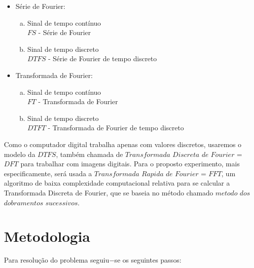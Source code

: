 \documentclass[conference]{IEEEtran}
\begin{document}
\begin{itemize}
	\item S\'erie de Fourier:
	\begin{enumerate}[(a)]
		\item Sinal de tempo cont\'inuo
		\\
		$FS$ - S\'erie de Fourier
		\item Sinal de tempo discreto
		\\
		$DTFS$ - S\'erie de Fourier de tempo discreto
	\end{enumerate}
	\item Transformada de Fourier:
	\begin{enumerate}[(a)]
		\item Sinal de tempo cont\'inuo
		\\
		$FT$ - Transformada de Fourier 
		\item Sinal de tempo discreto
		\\
		$DTFT$ - Transformada de Fourier de tempo discreto
	\end{enumerate}
\end{itemize}
\vspace{2\baselineskip}\vspace{-\parskip}
Como o computador digital trabalha apenas com valores discretos, usaremos o modelo da $DTFS$, tamb\'em chamada de $Transformada $ $Discreta $ $de $ $Fourier$ = $DFT$ para trabalhar com imagens digitais. Para o proposto experimento, mais especificamente, ser\'a usada a  $Transformada $ $Rapida $ $de $ $Fourier$ = $FFT$, um algoritmo de baixa complexidade computacional  relativa para se calcular a Transformada Discreta de Fourier, que se baseia no m\'etodo chamado $metodo $ $dos $ $dobramentos $ $sucessivos$.
 
\section{Metodologia} 
\label{sec:meth} 
Para resolu\c{c}\~ao do problema seguiu$-$se os seguintes passos:
\end{document}
